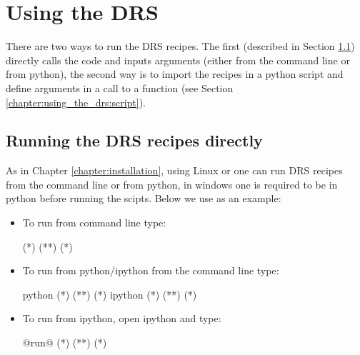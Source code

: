 \chapter{Using the DRS}
\label{chapter:using_the_drs}

There are two ways to run the DRS recipes. The first (described in Section \ref{chapter:using_the_drs:direct}) directly calls the code and inputs arguments (either from the command line or from python), the second way is to import the recipes in a python script and define arguments in a call to a function (see Section \ref{chapter:using_the_drs:script}).

\section{Running the DRS recipes directly}
\label{chapter:using_the_drs:direct}

As in Chapter \ref{chapter:installation}, using Linux or \mac one can run DRS recipes from the command line or from python, in windows one is required to be in python before running the scipts. Below we use \calDARK as an example:
\begin{itemize}
\item To run from command line type:
\begin{cmdbox}
(*\calDARK*) (**) (*) 
\end{cmdbox}

\item To run from python/ipython from the command line type:
\begin{cmdbox}
python (*\calDARK*) (**) (*) 
ipython (*\calDARK*) (**) (*)
\end{cmdbox}

\item To run from ipython, open ipython and type:
\begin{pythonbox}
@run@ (*\calDARK*) (**) (*)
\end{pythonbox}
\end{itemize}

